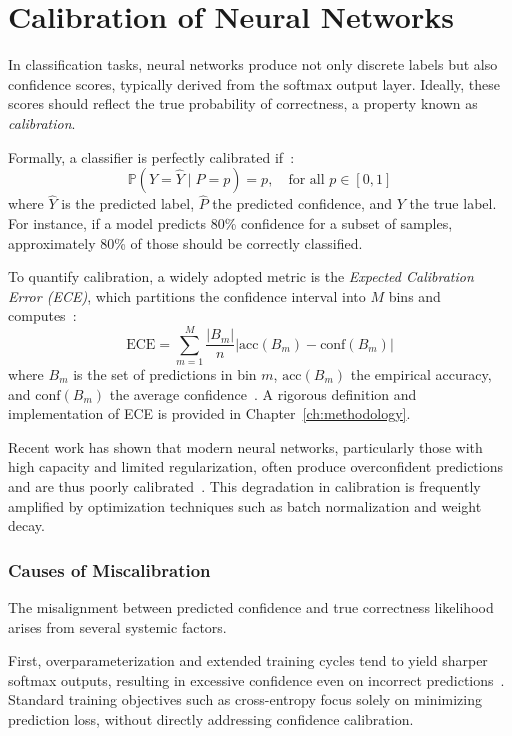 \section{Calibration of Neural Networks}
In classification tasks, neural networks produce not only discrete labels but also confidence scores, typically derived from the softmax output layer. Ideally, these scores should reflect the true probability of correctness, a property known as \textit{calibration}.

Formally, a classifier is perfectly calibrated if~\cite{guo2017calibration}:
\begin{equation}
\mathbb{P}(Y = \hat{Y} \mid \hat{P} = p) = p, \quad \text{for all } p \in [0, 1]
\end{equation}
where $\hat{Y}$ is the predicted label, $\hat{P}$ the predicted confidence, and $Y$ the true label. For instance, if a model predicts 80\% confidence for a subset of samples, approximately 80\% of those should be correctly classified.

To quantify calibration, a widely adopted metric is the \textit{Expected Calibration Error (ECE)}, which partitions the confidence interval into $M$ bins and computes~\cite{ece}:
\begin{equation}
\text{ECE} = \sum_{m=1}^{M} \frac{|B_m|}{n} \left| \text{acc}(B_m) - \text{conf}(B_m) \right|
\end{equation}
where $B_m$ is the set of predictions in bin $m$, $\text{acc}(B_m)$ the empirical accuracy, and $\text{conf}(B_m)$ the average confidence~\cite{naeini2015obtaining, guo2017calibration}. A rigorous definition and implementation of ECE is provided in Chapter~\ref{ch:methodology}.

Recent work has shown that modern neural networks, particularly those with high capacity and limited regularization, often produce overconfident predictions and are thus poorly calibrated~\cite{guo2017calibration}. This degradation in calibration is frequently amplified by optimization techniques such as batch normalization and weight decay.

\subsubsection{Causes of Miscalibration}
The misalignment between predicted confidence and true correctness likelihood arises from several systemic factors.

First, overparameterization and extended training cycles tend to yield sharper softmax outputs, resulting in excessive confidence even on incorrect predictions~\cite{guo2017calibration}. Standard training objectives such as cross-entropy focus solely on minimizing prediction loss, without directly addressing confidence calibration.

